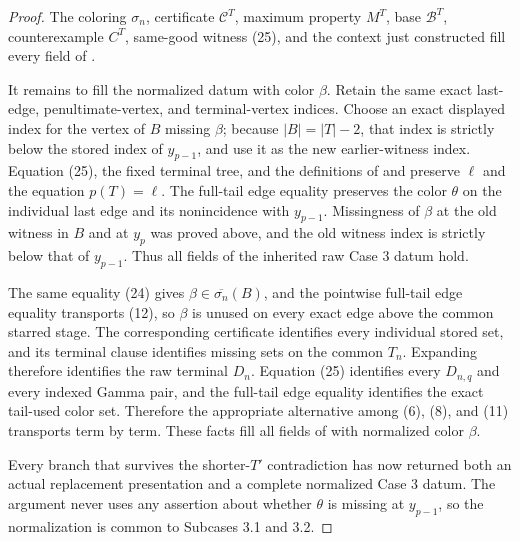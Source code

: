 \begin{proof}
The coloring \(\sigma_n\), certificate \(\mathcal C^T\), maximum property
\(M^T\), base \(\mathcal B^T\), counterexample \(C^T\), same-good witness
(25), and the context just constructed fill every field of
.

It remains to fill the normalized datum with color \(\beta\).  Retain the
same exact last-edge, penultimate-vertex, and terminal-vertex indices.
Choose an exact displayed index for the vertex of \(B\) missing \(\beta\);
because \(|B|=|T|-2\), that index is strictly below the stored index of
\(y_{p-1}\), and use it as the new earlier-witness index.  Equation (25),
the fixed terminal tree, and the
definitions of  and
 preserve \(\ell\) and the equation
\(p(T)=\ell\).  The full-tail edge equality preserves the color \(\theta\)
on the individual last edge and its nonincidence with \(y_{p-1}\).
Missingness of \(\beta\) at the old witness in \(B\) and at \(y_p\) was
proved above, and the old witness index is strictly below that of
\(y_{p-1}\).  Thus all fields of the inherited raw Case 3 datum hold.

The same equality (24) gives \(\beta\in\overline{\sigma_n}(B)\), and the
pointwise full-tail edge equality transports (12), so \(\beta\) is unused
on every exact edge above the common starred stage.  The corresponding
certificate identifies every individual stored set, and its terminal
 clause identifies missing sets on the common
\(T_n\).  Expanding  therefore identifies
the raw terminal \(D_n\).  Equation (25) identifies every \(D_{n,q}\) and
every indexed Gamma pair, and the full-tail edge equality identifies the
exact tail-used color set.
Therefore the appropriate alternative among (6), (8), and (11) transports
term by term.  These facts fill all fields of
 with normalized
color \(\beta\).

Every branch that survives the shorter-\(T'\) contradiction has now
returned both an actual replacement presentation and a complete normalized
Case 3 datum.  The argument never uses any assertion about whether
\(\theta\) is missing at \(y_{p-1}\), so the normalization is common to
Subcases 3.1 and 3.2.
\end{proof}
